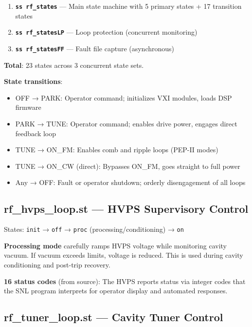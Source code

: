 \begin{enumerate}
\def\labelenumi{\arabic{enumi}.}
\tightlist
\item
  \textbf{\texttt{ss\ rf\_states}} --- Main state machine with 5 primary states + 17 transition states
\item
  \textbf{\texttt{ss\ rf\_statesLP}} --- Loop protection (concurrent monitoring)
\item
  \textbf{\texttt{ss\ rf\_statesFF}} --- Fault file capture (asynchronous)
\end{enumerate}

\textbf{Total}: 23 states across 3 concurrent state sets.

\textbf{State transitions}:

\begin{itemize}
\tightlist
\item
  OFF → PARK: Operator command; initializes VXI modules, loads DSP firmware
\item
  PARK → TUNE: Operator command; enables drive power, engages direct feedback loop
\item
  TUNE → ON\_FM: Enables comb and ripple loops (PEP-II modes)
\item
  TUNE → ON\_CW (direct): Bypasses ON\_FM, goes straight to full power
\item
  Any → OFF: Fault or operator shutdown; orderly disengagement of all loops
\end{itemize}

\subsection{rf\_hvps\_loop.st --- HVPS Supervisory Control}

States: \texttt{init} → \texttt{off} → \texttt{proc} (processing/conditioning) → \texttt{on}

\textbf{Processing mode} carefully ramps HVPS voltage while monitoring cavity vacuum. If vacuum exceeds limits, voltage is reduced. This is used during cavity conditioning and post-trip recovery.

\textbf{16 status codes} (from source): The HVPS reports status via integer codes that the SNL program interprets for operator display and automated responses.

\subsection{rf\_tuner\_loop.st --- Cavity Tuner Control}


